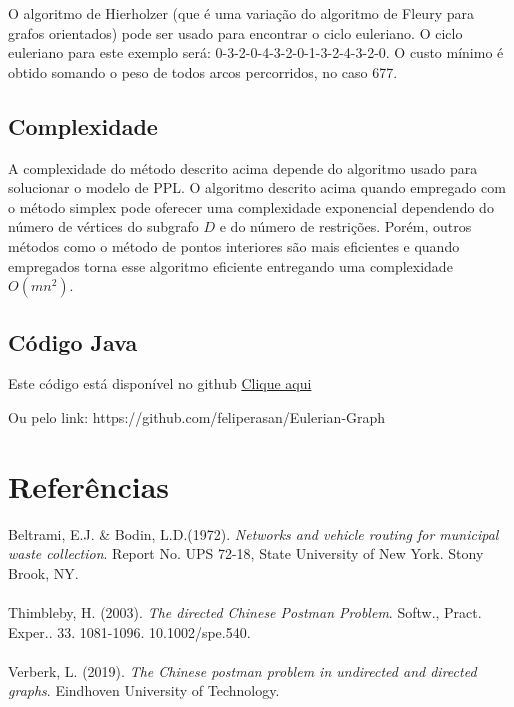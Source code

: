 \documentclass[a4paper, 12pt]{article}
\begin{document}
O algoritmo de Hierholzer (que é uma variação do algoritmo de Fleury para grafos orientados) pode ser usado para encontrar o ciclo euleriano.
O ciclo euleriano para este exemplo será: 0-3-2-0-4-3-2-0-1-3-2-4-3-2-0. O custo mínimo é obtido somando o peso de todos arcos percorridos, no caso 677.



	\subsection{Complexidade}
	A complexidade do método descrito acima depende do algoritmo usado para solucionar o modelo de PPL. O algoritmo descrito acima quando empregado com o método simplex pode oferecer uma complexidade exponencial dependendo do número de vértices do subgrafo $D$ e do número de restrições. Porém, outros métodos como o método de pontos interiores são mais eficientes e quando empregados torna esse algoritmo eficiente entregando uma complexidade $O(mn^2)$.
	
	\subsection{Código Java}
	Este código está disponível no github \href{https://github.com/feliperasan/Eulerian-Graph}{Clique aqui}
	
	Ou pelo link: https://github.com/feliperasan/Eulerian-Graph
	
	
	

	\newpage
	\section{Referências}
	
	Beltrami, E.J. \& Bodin, L.D.(1972). \textit{Networks and vehicle routing for municipal waste collection}. Report No. UPS 72-18, State University of New York. Stony Brook, NY.
	\\\\
	Thimbleby, H. (2003). \textit{The directed Chinese Postman Problem}. Softw., Pract. Exper.. 33. 1081-1096. 10.1002/spe.540.
	\\\\
	Verberk, L. (2019). \textit{The Chinese postman problem in undirected and directed graphs}. Eindhoven University of Technology.  
	
\end{document}
